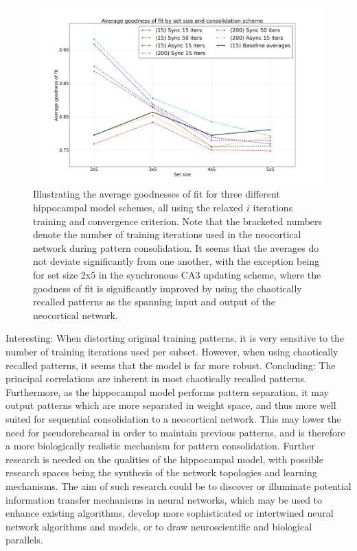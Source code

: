 
\begin{figure}
    \centering
    \includegraphics[width=14cm]{fig/neo-consolidation/consolidation-IO-span-all-with-baseline}
    \caption{Illustrating the average goodnesses of fit for three different hippocampal model schemes, all using the relaxed $i$ iterations training and convergence criterion. Note that the bracketed numbers denote the number of training iterations used in the neocortical network during pattern consolidation. It seems that the averages do not deviate significantly from one another, with the exception being for set size 2x5 in the synchronous CA3 updating scheme, where the goodness of fit is significantly improved by using the chaotically recalled patterns as the spanning input and output of the neocortical network.}
    \label{fig:consolidation-IO-span-all-with-baseline}
\end{figure}

Interesting: When distorting original training patterns, it is very sensitive to the number of training iterations used per subset.
However, when using chaotically recalled patterns, it seems that the model is far more robust. Concluding: The principal correlations are inherent in most chaotically recalled patterns. Furthermore, as the hippocampal model performs pattern separation, it may output patterns which are more separated in weight space, and thus more well suited for sequential consolidation to a neocortical network. This may lower the need for pseudorehearsal in order to maintain previous patterns, and is therefore a more biologically realistic mechanism for pattern consolidation. Further research is needed on the qualities of the hippocampal model, with possible research spaces being the synthesis of the network topologies and learning mechanisms. The aim of such research could be to discover or illuminate potential information transfer mechanisms in neural networks, which may be used to enhance existing algorithms, develop more sophisticated or intertwined neural network algorithms and models, or to draw neuroscientific and biological parallels.

